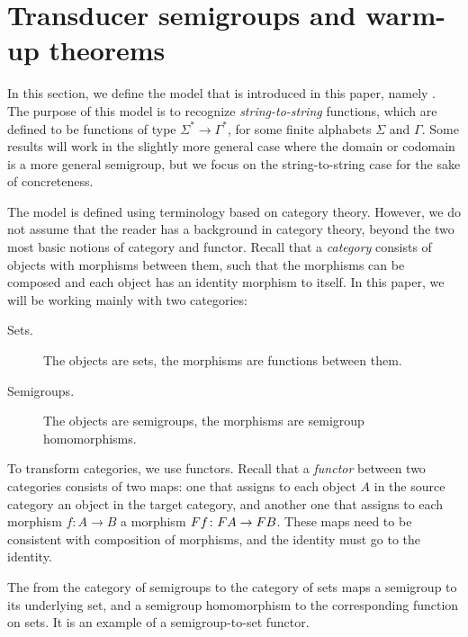 \section{Transducer semigroups and warm-up theorems}\label{sec:warm-up}

In this section, we define the model that is introduced in this paper, namely . The purpose of this model is to recognize \emph{string-to-string} functions, which are defined to be functions of type $\Sigma^* \to \Gamma^*$, for some finite alphabets $\Sigma$ and $\Gamma$. Some results will work in the slightly more general case where the domain or codomain is a more general semigroup, but we focus on the string-to-string case for the sake of concreteness.

The model is defined using terminology based on category theory. However, we do not assume that the reader has a background in category theory, beyond the two most basic notions of category and functor. Recall that a \emph{category} consists of objects with morphisms between them, such that the morphisms can be composed and each object has an identity morphism to itself. In this paper, we will be working mainly with two categories:
\begin{description}
 \item[Sets.] The objects are sets, the morphisms are functions between them.
 \item[Semigroups.] The objects are semigroups, the morphisms are semigroup homomorphisms.
\end{description}
To transform categories, we use {functors}.
Recall that a \emph{functor} between two categories consists of two maps: one that assigns to each object $A$ in the source category an object in the target category, and another one that assigns to each morphism $f\colon A \to B$ a morphism $\functor f\colon \functor A \to \functor B$. These maps need to be consistent with composition of morphisms, and the identity must go to the identity.
\begin{example}\label{ex:forgetful}
    The  from the category of semigroups to the category of sets maps a semigroup to its underlying set, and a semigroup homomorphism to the corresponding function on sets. It is an example of a semigroup-to-set functor.
\end{example}
